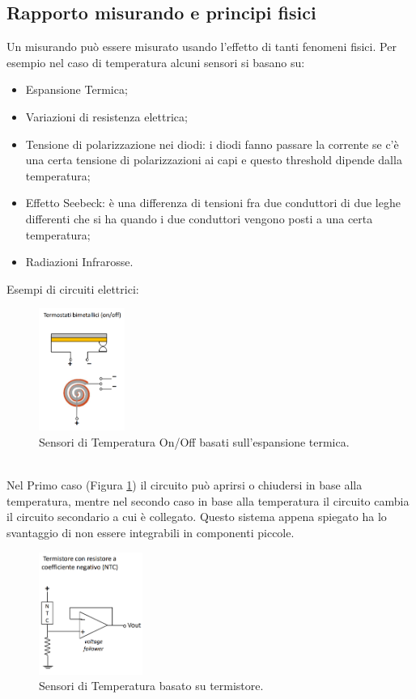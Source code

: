 \documentclass[11pt, twocolumn]{article}
\newenvironment{myitemize}
{ \begin{itemize}[topsep=0ex]
		\setlength{\itemsep}{0pt}
		\setlength{\parskip}{0pt}
		\setlength{\parsep}{0pt}     }
	{ \end{itemize}                  }
\begin{document}
\subsection{Rapporto misurando e principi fisici}
Un misurando può essere misurato usando l'effetto di tanti fenomeni fisici.
Per esempio nel caso di temperatura alcuni sensori si basano su:
\begin{myitemize}
  \item Espansione Termica;
  \item Variazioni di resistenza elettrica;
  \item Tensione di polarizzazione nei diodi: i diodi fanno passare la corrente se c'è una certa tensione di polarizzazioni ai capi e questo threshold dipende dalla temperatura;
  \item Effetto Seebeck: è una differenza di tensioni fra due conduttori di due leghe differenti che si ha quando i due conduttori vengono posti a una certa temperatura;
  \item Radiazioni Infrarosse.
\end{myitemize}
Esempi di circuiti elettrici:\\
\begin{figure}[!h]
  \centering
  \includegraphics[width=\linewidth,height=4cm]{imgs/on_off.png}
  \caption{Sensori di Temperatura On/Off basati sull'espansione termica.}
  \label{fig:on_off}
\end{figure}\\
Nel Primo caso (Figura \ref{fig:on_off}) il circuito può aprirsi o chiudersi in base alla temperatura, mentre nel secondo caso in base alla temperatura il circuito cambia il circuito secondario a cui è collegato. 
Questo sistema appena spiegato ha lo svantaggio di non essere integrabili in componenti piccole.\\
\begin{figure}[!h]
  \centering
  \includegraphics[width=\linewidth,height=4cm]{imgs/thermistor.png}
  \caption{Sensori di Temperatura basato su termistore.}
  \label{fig:thermistor}
\end{figure}\\
\end{document}
